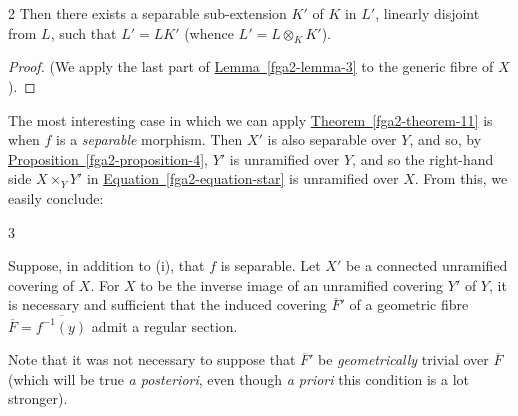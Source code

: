 \begin{corollary}{2}
    Then there exists a separable sub-extension \(K'\) of \(K\) in \(L'\), linearly disjoint from \(L\), such that \(L'=LK'\) (whence \(L'=L\otimes _KK'\)).\begin{proof}\par{}(We apply the last part of \hyperref[fga2-lemma-3]{Lemma~\ref*{fga2-lemma-3}} to the generic fibre of \(X\)).\end{proof}\end{corollary}\par{}The most interesting case in which we can apply \hyperref[fga2-theorem-11]{Theorem~\ref*{fga2-theorem-11}} is when \(f\) is a \emph{separable} morphism.
  Then \(X'\) is also separable over \(Y\), and so, by \hyperref[fga2-proposition-4]{Proposition~\ref*{fga2-proposition-4}}, \(Y'\) is unramified over \(Y\), and so the right-hand side \(X\times _YY'\) in \hyperref[fga2-equation-star]{Equation~\ref*{fga2-equation-star}} is unramified over \(X\).
  From this, we easily conclude:\begin{corollary}{3}\label{fga2-theorem-11-corollary-3}\skipsinglepar\par{}Suppose, in addition to (i), that \(f\) is separable.
    Let \(X'\) be a connected unramified covering of \(X\).
    For \(X\) to be the inverse image of an unramified covering \(Y'\) of \(Y\), it is necessary and sufficient that the induced covering \(\overline {F}'\) of a geometric fibre \(\overline {F}=\overline {f^{-1}(y)}\) admit a regular section.\end{corollary}\par{}Note that it was not necessary to suppose that \(\overline {F}'\) be \emph{geometrically} trivial over \(\overline {F}\) (which will be true \emph{a posteriori}, even though \emph{a priori} this condition is a lot stronger).
  
